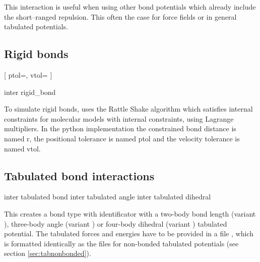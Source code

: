 This interaction is useful when using other bond potentials which already
include the short--ranged repulsion. This often the case for force fields or in
general tabulated potentials.

\subsection{Rigid bonds}
\label{sec:rattle}

\begin{pysyntax}
[
	ptol=,
	vtol=
]
\end{pysyntax}

\begin{essyntax}
  inter 
  rigid_bond
    
  \begin{features}
  \end{features}
\end{essyntax}

To simulate rigid bonds, \es uses the Rattle Shake algorithm which
satisfies internal constraints for molecular models with internal
constraints, using Lagrange multipliers.\cite{andersen83a}
In the python implementation the constrained bond distance is named r, the positional tolerance is named ptol and the velocity tolerance is named vtol.

\subsection{Tabulated bond interactions}

\begin{essyntax}
     inter 
    tabulated bond 
     inter 
    tabulated angle 
     inter 
    tabulated dihedral 
\end{essyntax}

This creates a bond type with identificator  with a
two-body bond length (variant ), three-body angle (variant
) or four-body dihedral (variant ) tabulated
potential. The tabulated forces and energies have to be provided in a
file , which is formatted identically as the files for
non-bonded tabulated potentials (see section \ref{sec:tabnonbonded}).

